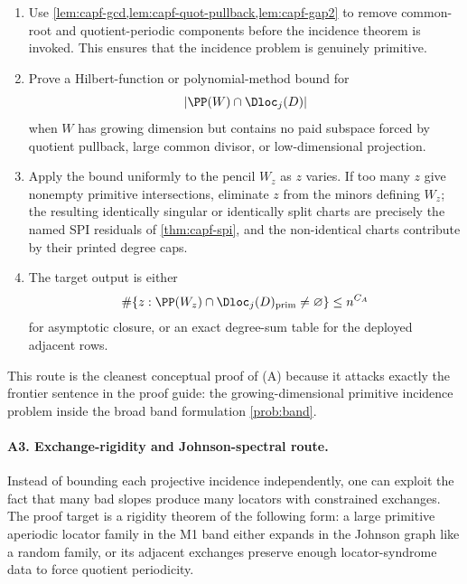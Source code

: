 \documentclass[11pt]{article}
\theoremstyle{definition}
\theoremstyle{remark}
\begin{document}
\begin{enumerate}[label=\textup{A2.\arabic*},leftmargin=3.0em]
\item Use \cref{lem:capf-gcd,lem:capf-quot-pullback,lem:capf-gap2} to remove common-root and quotient-periodic components before the incidence theorem is invoked.  This ensures that the incidence problem is genuinely primitive.
\item Prove a Hilbert-function or polynomial-method bound for
\[
        |\PP(W)\cap\Dloc_j(D)|
\]
when $W$ has growing dimension but contains no paid subspace forced by quotient pullback, large common divisor, or low-dimensional projection.
\item Apply the bound uniformly to the pencil $W_z$ as $z$ varies.  If too many $z$ give nonempty primitive intersections, eliminate $z$ from the minors defining $W_z$; the resulting identically singular or identically split charts are precisely the named SPI residuals of \cref{thm:capf-spi}, and the non-identical charts contribute by their printed degree caps.
\item The target output is either
\[
        \#\{z:\PP(W_z)\cap\Dloc_j(D)_{\rm prim}\ne\varnothing\}\le n^{C_A}
\]
for asymptotic closure, or an exact degree-sum table for the deployed adjacent rows.
\end{enumerate}

This route is the cleanest conceptual proof of \textup{(A)} because it attacks exactly the frontier sentence in the proof guide: the growing-dimensional primitive incidence problem inside the broad band formulation \cref{prob:band}.

\paragraph{A3. Exchange-rigidity and Johnson-spectral route.}
Instead of bounding each projective incidence independently, one can exploit the fact that many bad slopes produce many locators with constrained exchanges.  The proof target is a rigidity theorem of the following form: a large primitive aperiodic locator family in the M1 band either expands in the Johnson graph like a random family, or its adjacent exchanges preserve enough locator-syndrome data to force quotient periodicity.
\end{document}
